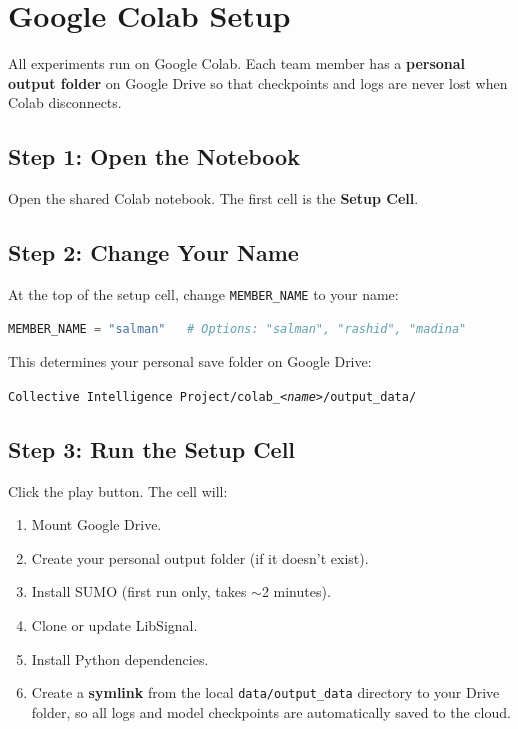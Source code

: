 \documentclass[11pt,a4paper]{article}
\begin{document}
\section{Google Colab Setup}

All experiments run on Google Colab.  Each team member has a \textbf{personal output folder} on Google Drive so that checkpoints and logs are never lost when Colab disconnects.

\subsection{Step 1: Open the Notebook}

Open the shared Colab notebook.  The first cell is the \textbf{Setup Cell}.

\subsection{Step 2: Change Your Name}

At the top of the setup cell, change \texttt{MEMBER\_NAME} to your name:

\begin{lstlisting}[language=Python]
MEMBER_NAME = "salman"   # Options: "salman", "rashid", "madina"
\end{lstlisting}

This determines your personal save folder on Google Drive:
\begin{center}
\texttt{Collective Intelligence Project/colab\_\textit{<name>}/output\_data/}
\end{center}

\subsection{Step 3: Run the Setup Cell}

Click the play button.  The cell will:
\begin{enumerate}
    \item Mount Google Drive.
    \item Create your personal output folder (if it doesn't exist).
    \item Install SUMO (first run only, takes $\sim$2 minutes).
    \item Clone or update LibSignal.
    \item Install Python dependencies.
    \item Create a \textbf{symlink} from the local \texttt{data/output\_data} directory to your Drive folder, so all logs and model checkpoints are automatically saved to the cloud.
\end{enumerate}
\end{document}
